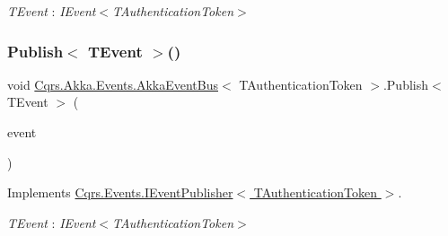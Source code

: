 \begin{Desc}
\item[Type Constraints]\begin{description}
\item[{\em T\+Event} : {\em I\+Event$<$T\+Authentication\+Token$>$}]\end{description}
\end{Desc}
\mbox{\label{classCqrs_1_1Akka_1_1Events_1_1AkkaEventBus_aaba5d37020e21d03cc2bbc3da14f45ea}} 
\subsubsection{\texorpdfstring{Publish$<$ T\+Event $>$()}{Publish< TEvent >()}\hspace{0.1cm}{\footnotesize\ttfamily [1/2]}}
{\footnotesize\ttfamily void \hyperlink{classCqrs_1_1Akka_1_1Events_1_1AkkaEventBus}{Cqrs.\+Akka.\+Events.\+Akka\+Event\+Bus}$<$ T\+Authentication\+Token $>$.Publish$<$ T\+Event $>$ (\begin{DoxyParamCaption}\item[{T\+Event @}]{event }\end{DoxyParamCaption})}



Implements \hyperlink{interfaceCqrs_1_1Events_1_1IEventPublisher_a02f0db0bc9b3aa1c7f766f58f8422ee3}{Cqrs.\+Events.\+I\+Event\+Publisher$<$ T\+Authentication\+Token $>$}.

\begin{Desc}
\item[Type Constraints]\begin{description}
\item[{\em T\+Event} : {\em I\+Event$<$T\+Authentication\+Token$>$}]\end{description}
\end{Desc}
\mbox{\label{classCqrs_1_1Akka_1_1Events_1_1AkkaEventBus_ad5b996dd77efbf51a2b5a32f94417772}} 
